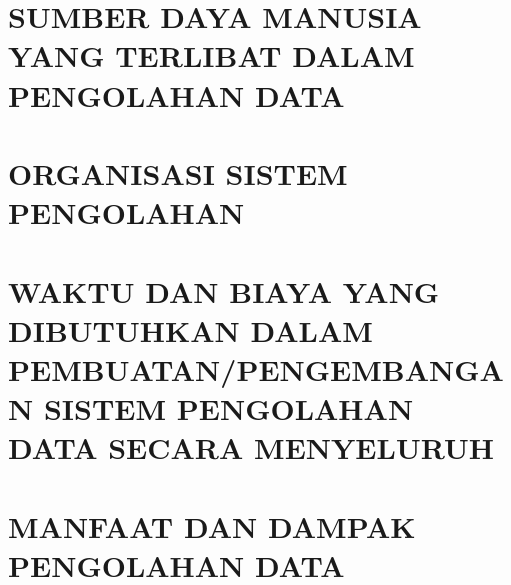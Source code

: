 \documentclass[pdftex,12pt, oneside]{article}
\begin{document}
\section{SUMBER DAYA MANUSIA YANG TERLIBAT DALAM PENGOLAHAN DATA}


\section{ORGANISASI SISTEM PENGOLAHAN}


\section{WAKTU DAN BIAYA YANG DIBUTUHKAN DALAM PEMBUATAN/PENGEMBANGAN SISTEM PENGOLAHAN DATA SECARA MENYELURUH}


\section{MANFAAT DAN DAMPAK PENGOLAHAN DATA}
\end{document}
